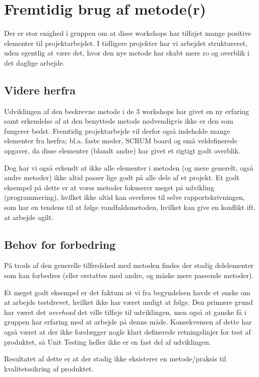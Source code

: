\section{Fremtidig brug af metode(r)}\label{workshop3:fremtidig_brug}
Der er stor enighed i gruppen om at disse workshops har tilføjet mange positive elementer til projektarbejdet.
I tidligere projekter har vi arbejdet struktureret, uden egentlig at være det, hvor den nye metode har skabt mere ro og overblik i det daglige arbejde.

\subsection{Videre herfra}
Udviklingen af den beskrevne metode i de 3 workshops har givet en ny erfaring samt erkendelse af at den benyttede metode nødvendigvis ikke er den som fungerer bedst.
Fremtidig projektarbejde vil derfor også indeholde mange elementer fra herfra; bl.a. faste møder, SCRUM board og små veldefinerede opgaver, da disse elementer (blandt andre) har givet et rigtigt godt overblik.

Dog har vi også erkendt at ikke alle elementer i metoden (og mere generelt, også andre metoder) ikke altid passer lige godt på alle dele af et projekt.
Et godt eksempel på dette er at vores metoder fokuserer meget på udvikling (programmering), hvilket ikke altid kan overføres til selve rapportskrivningen, som har en tendens til at følge vandfaldsmetoden, hvilket kan give en konflikt ift. at arbejde agilt.

\subsection{Behov for forbedring}
På trods af den generelle tilfredshed med metoden findes der stadig delelementer som kan forbedres (eller erstattes med andre, og måske mere passende metoder).

Et meget godt eksempel er det faktum at vi fra begyndelsen havde et ønske om at arbejde testdrevet, hvilket ikke har været muligt at følge.
Den primære grund har været det \textit{overhead} det ville tilføje til udviklingen, men også at ganske få i gruppen har erfaring med at arbejde på denne måde.
Konsekvensen af dette har også været at der ikke forelægger nogle klart definerede retningslinjer for test af produktet, så Unit Testing heller ikke er en fast del af udviklingen.

Resultatet af dette er at der stadig ikke eksisterer en metode/praksis til kvalitetssikring af produktet.